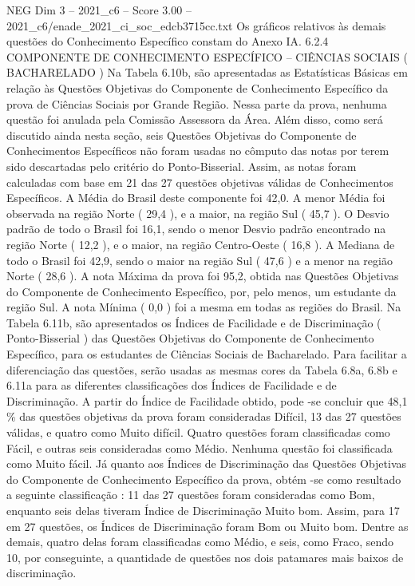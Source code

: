 \begin{textsample}{NEG Dim 3 – 2021\_c6 – Score 3.00 – 2021\_c6/enade\_2021\_ci\_soc\_edcb3715cc.txt}
Os gráficos relativos às demais questões do Conhecimento Específico constam do Anexo IA. 6.2.4 COMPONENTE DE CONHECIMENTO ESPECÍFICO – CIÊNCIAS SOCIAIS ( BACHARELADO ) Na Tabela 6.10b, são apresentadas as Estatísticas Básicas em relação às Questões Objetivas do Componente de Conhecimento Específico da prova de Ciências Sociais por Grande Região.
Nessa parte da prova, nenhuma questão foi anulada pela Comissão Assessora da Área.
Além disso, como será discutido ainda nesta seção, seis Questões Objetivas do Componente de Conhecimentos Específicos não foram usadas no cômputo das notas por terem sido descartadas pelo critério do Ponto-Bisserial.
Assim, as notas foram calculadas com base em 21 das 27 questões objetivas válidas de Conhecimentos Específicos.
A Média do Brasil deste componente foi 42,0.
A menor Média foi observada na região Norte ( 29,4 ), e a maior, na região Sul ( 45,7 ).
O Desvio padrão de todo o Brasil foi 16,1, sendo o menor Desvio padrão encontrado na região Norte ( 12,2 ), e o maior, na região Centro-Oeste ( 16,8 ).
A Mediana de todo o Brasil foi 42,9, sendo o maior na região Sul ( 47,6 ) e a menor na região Norte ( 28,6 ).
A nota Máxima da prova foi 95,2, obtida nas Questões Objetivas do Componente de Conhecimento Específico, por, pelo menos, um estudante da região Sul.
A nota Mínima ( 0,0 ) foi a mesma em todas as regiões do Brasil.
Na Tabela 6.11b, são apresentados os Índices de Facilidade e de Discriminação ( Ponto-Bisserial ) das Questões Objetivas do Componente de Conhecimento Específico, para os estudantes de Ciências Sociais de Bacharelado.
Para facilitar a diferenciação das questões, serão usadas as mesmas cores da Tabela 6.8a, 6.8b e 6.11a para as diferentes classificações dos Índices de Facilidade e de Discriminação.
A partir do Índice de Facilidade obtido, pode -se concluir que 48,1 \% das questões objetivas da prova foram consideradas Difícil, 13 das 27 questões válidas, e quatro como Muito difícil.
Quatro questões foram classificadas como Fácil, e outras seis consideradas como Médio.
Nenhuma questão foi classificada como Muito fácil.
Já quanto aos Índices de Discriminação das Questões Objetivas do Componente de Conhecimento Específico da prova, obtém -se como resultado a seguinte classificação : 11 das 27 questões foram consideradas como Bom, enquanto seis delas tiveram Índice de Discriminação Muito bom.
Assim, para 17 em 27 questões, os Índices de Discriminação foram Bom ou Muito bom.
Dentre as demais, quatro delas foram classificadas como Médio, e seis, como Fraco, sendo 10, por conseguinte, a quantidade de questões nos dois patamares mais baixos de discriminação.

\end{textsample}
